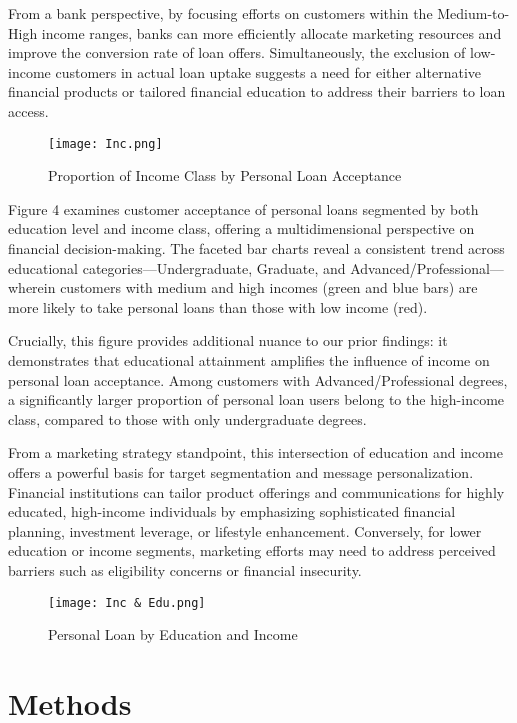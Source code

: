 \documentclass[12pt]{article}
\begin{document}
From a bank perspective, by focusing efforts on customers within the Medium-to-High income ranges, banks can more efficiently allocate marketing resources and improve the conversion rate of loan offers. Simultaneously, the exclusion of low-income customers in actual loan uptake suggests a need for either alternative financial products or tailored financial education to address their barriers to loan access.

\begin{figure}
    \centering
    \texttt{[image: Inc.png]}
    \caption{Proportion of Income Class by Personal Loan Acceptance}
    \label{fig:enter-label}
\end{figure}

Figure 4 examines customer acceptance of personal loans segmented by both education level and income class, offering a multidimensional perspective on financial decision-making. The faceted bar charts reveal a consistent trend across educational categories—Undergraduate, Graduate, and Advanced/Professional—wherein customers with medium and high incomes (green and blue bars) are more likely to take personal loans than those with low income (red).

Crucially, this figure provides additional nuance to our prior findings: it demonstrates that educational attainment amplifies the influence of income on personal loan acceptance. Among customers with Advanced/Professional degrees, a significantly larger proportion of personal loan users belong to the high-income class, compared to those with only undergraduate degrees. 

From a marketing strategy standpoint, this intersection of education and income offers a powerful basis for target segmentation and message personalization. Financial institutions can tailor product offerings and communications for highly educated, high-income individuals by emphasizing sophisticated financial planning, investment leverage, or lifestyle enhancement. Conversely, for lower education or income segments, marketing efforts may need to address perceived barriers such as eligibility concerns or financial insecurity.

\begin{figure}
    \centering
    \texttt{[image: Inc \& Edu.png]}
    \caption{Personal Loan by Education and Income}
    \label{fig:enter-label}
\end{figure}

\section{Methods}
\end{document}
